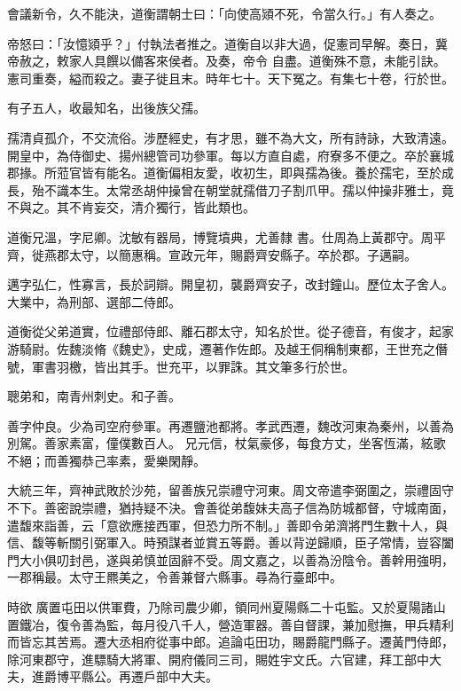 \begin{pinyinscope}
 會議新令，久不能決，道衡謂朝士曰：「向使高熲不死，令當久行。」有人奏之。



 帝怒曰：「汝憶熲乎？」付執法者推之。道衡自以非大過，促憲司早解。奏日，冀帝赦之，敕家人具饌以備客來侯者。及奏，帝令
 自盡。道衡殊不意，未能引訣。憲司重奏，縊而殺之。妻子徙且末。時年七十。天下冤之。有集七十卷，行於世。



 有子五人，收最知名，出後族父孺。



 孺清貞孤介，不交流俗。涉歷經史，有才思，雖不為大文，所有詩詠，大致清遠。開皇中，為侍御史、揚州總管司功參軍。每以方直自處，府寮多不便之。卒於襄城郡掾。所蒞官皆有能名。道衡偏相友愛，收初生，即與孺為後。養於孺宅，至於成長，殆不識本生。太常丞胡仲操曾在朝堂就孺借刀子割爪甲。孺以仲操非雅士，竟不與之。其不肯妄交，清介獨行，皆此類也。



 道衡兄溫，字尼卿。沈敏有器局，博覽墳典，尤善隸
 書。仕周為上黃郡守。周平齊，徙燕郡太守，以簡惠稱。宣政元年，賜爵齊安縣子。卒於郡。子邁嗣。



 邁字弘仁，性寡言，長於詞辯。開皇初，襲爵齊安子，改封鐘山。歷位太子舍人。大業中，為刑部、選部二侍郎。



 道衡從父弟道實，位禮部侍郎、離石郡太守，知名於世。從子德音，有俊才，起家游騎尉。佐魏淡脩《魏史》，史成，遷著作佐郎。及越王侗稱制東都，王世充之僭號，軍書羽檄，皆出其手。世充平，以罪誅。其文筆多行於世。



 聰弟和，南青州刺史。和子善。



 善字仲良。少為司空府參軍。再遷鹽池都將。孝武西遷，魏改河東為秦州，以善為別駕。善家素富，僮僕數百人。
 兄元信，杖氣豪侈，每食方丈，坐客恆滿，絃歌不絕；而善獨恭己率素，愛樂閑靜。



 大統三年，齊神武敗於沙苑，留善族兄崇禮守河東。周文帝遣李弼圍之，崇禮固守不下。善密說崇禮，猶持疑不決。會善從弟馥妹夫高子信為防城都督，守城南面，遣馥來詣善，云「意欲應接西軍，但恐力所不制。」善即令弟濟將門生數十人，與信、馥等斬關引弼軍入。時預謀者並賞五等爵。善以背逆歸順，臣子常情，豈容闔門大小俱叨封邑，遂與弟慎並固辭不受。周文嘉之，以善為汾陰令。善幹用強明，一郡稱最。太守王羆美之，令善兼督六縣事。尋為行臺郎中。



 時欲
 廣置屯田以供軍費，乃除司農少卿，領同州夏陽縣二十屯監。又於夏陽諸山置鐵冶，復令善為監，每月役八千人，營造軍器。善自督課，兼加慰撫，甲兵精利而皆忘其苦焉。遷大丞相府從事中郎。追論屯田功，賜爵龍門縣子。遷黃門侍郎，除河東郡守，進驃騎大將軍、開府儀同三司，賜姓宇文氏。六官建，拜工部中大夫，進爵博平縣公。再遷戶部中大夫。




\end{pinyinscope}
